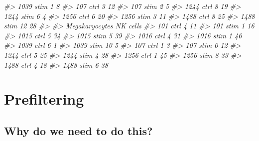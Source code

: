\documentclass[
]{book}
\newenvironment{Shaded}{\begin{snugshade}}{\end{snugshade}}
\newcommand{\CommentTok}[1]{\textcolor[rgb]{0.56,0.35,0.01}{\textit{#1}}}
\begin{document}
\begin{Shaded}
\begin{Highlighting}[]
\CommentTok{\#\textgreater{}   1039 stim               1                 8}
\CommentTok{\#\textgreater{}   107 ctrl                3                12}
\CommentTok{\#\textgreater{}   107 stim                2                 5}
\CommentTok{\#\textgreater{}   1244 ctrl               8                19}
\CommentTok{\#\textgreater{}   1244 stim               6                 4}
\CommentTok{\#\textgreater{}   1256 ctrl               6                20}
\CommentTok{\#\textgreater{}   1256 stim               3                11}
\CommentTok{\#\textgreater{}   1488 ctrl               8                25}
\CommentTok{\#\textgreater{}   1488 stim              12                28}
\CommentTok{\#\textgreater{}            }
\CommentTok{\#\textgreater{}             Megakaryocytes NK cells}
\CommentTok{\#\textgreater{}   101 ctrl               4       11}
\CommentTok{\#\textgreater{}   101 stim               1       16}
\CommentTok{\#\textgreater{}   1015 ctrl              5       34}
\CommentTok{\#\textgreater{}   1015 stim              5       39}
\CommentTok{\#\textgreater{}   1016 ctrl              4       31}
\CommentTok{\#\textgreater{}   1016 stim              1       46}
\CommentTok{\#\textgreater{}   1039 ctrl              6        1}
\CommentTok{\#\textgreater{}   1039 stim             10        5}
\CommentTok{\#\textgreater{}   107 ctrl               1        3}
\CommentTok{\#\textgreater{}   107 stim               0       12}
\CommentTok{\#\textgreater{}   1244 ctrl              5       25}
\CommentTok{\#\textgreater{}   1244 stim              4       28}
\CommentTok{\#\textgreater{}   1256 ctrl              1       45}
\CommentTok{\#\textgreater{}   1256 stim              8       33}
\CommentTok{\#\textgreater{}   1488 ctrl              4       18}
\CommentTok{\#\textgreater{}   1488 stim              6       38}
\end{Highlighting}
\end{Shaded}

\hypertarget{prefiltering}{%
\section{Prefiltering}\label{prefiltering}}

\hypertarget{why-do-we-need-to-do-this-7}{%
\subsection*{Why do we need to do this?}\label{why-do-we-need-to-do-this-7}}
\end{document}
